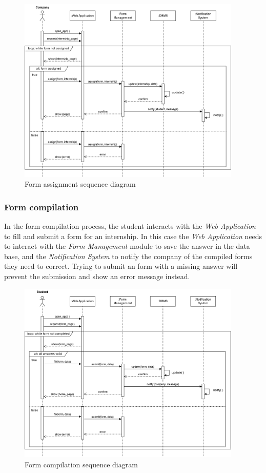 \documentclass[11pt,twoside]{article}
\begin{document}
\begin{figure}[H]
\centering
\includegraphics[width=0.95\textwidth]{Images/Seq5}
\caption{Form assignment sequence diagram}\label{Seq5}
\end{figure}

\newpage

		\subsubsection{Form compilation}
In the form compilation process, the student interacts with the \textit{Web Application} to fill and submit a form for an internship.	In this case the \textit{Web Application} needs to interact with the \textit{Form Management} module to save the answer in the data base, and the \textit{Notification System} to notify the company of the compiled forms they need to correct. Trying to submit an form with a missing answer will prevent the submission and show an error message instead.
		
\begin{figure}[H]
\centering
\includegraphics[width=0.95\textwidth]{Images/Seq6}
\caption{Form compilation sequence diagram}\label{Seq6}
\end{figure}
\end{document}
